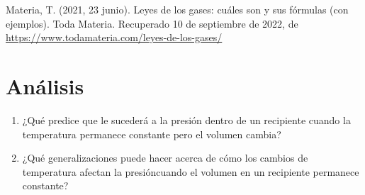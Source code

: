 \documentclass[]{article}
\begin{document}
\begin{thebibliography}{6}
       Materia, T. (2021, 23 junio). Leyes de los gases: cuáles son y sus fórmulas (con ejemplos). Toda Materia. Recuperado 10 de septiembre de 2022, 
      de \url{https://www.todamateria.com/leyes-de-los-gases/}
\end{thebibliography}



































\section{Análisis}
\begin{enumerate}
      \item ¿Qué predice que le sucederá a la presión dentro de un recipiente cuando la temperatura permanece constante pero el volumen cambia?
      \item ¿Qué generalizaciones puede hacer acerca de cómo los cambios de temperatura afectan la presióncuando el volumen en un recipiente permanece constante?
\end{enumerate}

\end{document}
